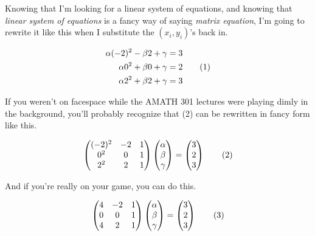 \documentclass{article}
\newcommand\numberthis{\addtocounter{equation}{1}\tag{\theequation}}
\def\a{\alpha}
\def\b{\beta}
\def\c{\gamma}
\begin{document}
Knowing that I'm looking for a linear system of equations, and knowing that \textit{linear system of equations} is a fancy way of saying \textit{matrix equation}, I'm going to rewrite it like this when I substitute the $(x_i, y_i)$'s back in. 

\begin{align*}
 \a (-2)^2 - \b 2 + \c &= 3 \\
 \a 0^2 + \b 0 + \c &= 2 \numberthis \\
 \a 2^2 + \b 2 + \c &= 3 \\
\end{align*}

If you weren't on facespace while the AMATH 301 lectures were playing dimly in the background, you'll probably recognize that (2) can be rewritten in fancy form like this.

\[
\begin{pmatrix} (-2)^2 & -2 & 1 \\ 0^2 & 0 & 1 \\ 2^2 & 2 & 1\\ \end{pmatrix}
\begin{pmatrix} \a \\ \b \\ \c \\ \end{pmatrix} = 
\begin{pmatrix} 3 \\ 2 \\ 3 \\ \end{pmatrix} \numberthis
\] 

And if you're really on your game, you can do this.

\[
\begin{pmatrix} 4 & -2 & 1 \\ 0 & 0 & 1 \\ 4 & 2 & 1\\ \end{pmatrix}
\begin{pmatrix} \a \\ \b \\ \c \\ \end{pmatrix} = 
\begin{pmatrix} 3 \\ 2 \\ 3 \\ \end{pmatrix} \numberthis
\] 
\end{document}

